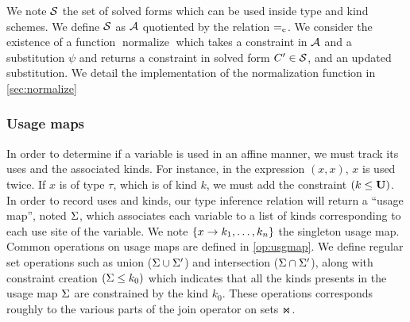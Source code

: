 We note $\mathcal S$ the set of solved forms
which can be used inside type and kind schemes.
We define $\mathcal S$ as $\mathcal A$ quotiented by the relation $\operatorname{=_e}$.
%
We consider the existence of a function $\operatorname{normalize}$ which takes
a constraint in $\mathcal A$ and a substitution $\psi$ and returns a constraint
in solved form $C' \in \mathcal S$,
and an updated substitution. We detail the implementation
of the normalization function in \cref{sec:normalize}




\subsubsection{Usage maps}

In order to determine if a variable is used in an affine manner, we must track
its uses and the associated kinds. For instance, in the expression
$(x,x)$, $x$ is used twice. If $x$ is of type $\tau$, which is of kind $k$,
we must add the constraint $(k \leq \mathbf{U})$. In order to record uses and kinds,
our type inference relation will return a ``usage map'', noted $\Sigma$,
which associates each variable to a list of kinds corresponding to each use site
of the variable.
We note $\left\{x \to k_1,\dots,k_n\right\}$ the singleton usage map.
Common operations on usage maps are defined in \cref{op:usgmap}. We define
regular set operations such as union
($\Sigma\cup\Sigma'$) and intersection ($\Sigma\cap\Sigma'$), along
with constraint creation $(\Sigma \leq k_0)$ which indicates that all the kinds
presents in the usage map $\Sigma$ are constrained by the kind $k_0$.
These operations corresponds roughly to the various parts of the join
operator on sets $\operatorname{\Join}$.

